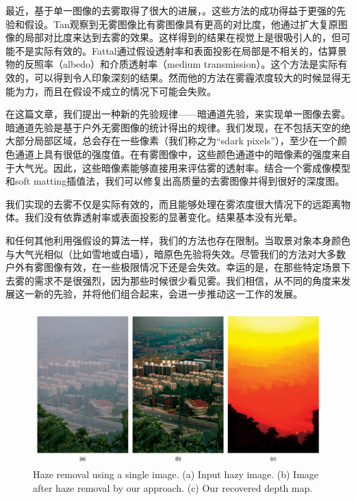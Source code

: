 \documentclass{ctexart}
\begin{document}
最近，基于单一图像的去雾取得了很大的进展\cite{Fattal2008}，\cite{Tan2008}。这些方法的成功得益于更强的先验和假设。Tan\cite{Tan2008}观察到无雾图像比有雾图像具有更高的对比度，他通过扩大复原图像的局部对比度来达到去雾的效果。这样得到的结果在视觉上是很吸引人的，但可能不是实际有效的。Fattal\cite{Fattal2008}通过假设透射率和表面投影在局部是不相关的，估算景物的反照率（albedo）和介质透射率（medium transmission）。这个方法是实际有效的，可以得到令人印象深刻的结果。然而他的方法在雾霾浓度较大的时候显得无能为力，而且在假设不成立的情况下可能会失败。\par

在这篇文章，我们提出一种新的先验规律——暗通道先验，来实现单一图像去雾。暗通道先验是基于户外无雾图像的统计得出的规律。我们发现，在不包括天空的绝大部分局部区域，总会存在一些像素（我们称之为“sdark pixels”），至少在一个颜色通道上具有很低的强度值。在有雾图像中，这些颜色通道中的暗像素的强度来自于大气光。因此，这些暗像素能够直接用来评估雾的透射率。结合一个雾成像模型和soft matting插值法，我们可以修复出高质量的去雾图像并得到很好的深度图。\par

我们实现的去雾不仅是实际有效的，而且能够处理在雾浓度很大情况下的远距离物体。我们没有依靠透射率或表面投影的显著变化。结果基本没有光晕。\par

和任何其他利用强假设的算法一样，我们的方法也存在限制。当取景对象本身颜色与大气光相似（比如雪地或白墙），暗原色先验将失效。尽管我们的方法对大多数户外有雾图像有效，在一些极限情况下还是会失效。幸运的是，在那些特定场景下去雾的需求不是很强烈，因为那些时候很少看见雾。我们相信，从不同的角度来发展这一新的先验，并将他们组合起来，会进一步推动这一工作的发展。\par

\begin{figure}[tbp]
    \centering
    \includegraphics[width=\textwidth]{img/02.png}
    \caption{Haze removal using a single image. (a) Input hazy image. (b) Image after haze removal by our approach. (c) Our recovered depth map.}
    \label{fig:01}
\end{figure}
\end{document}
